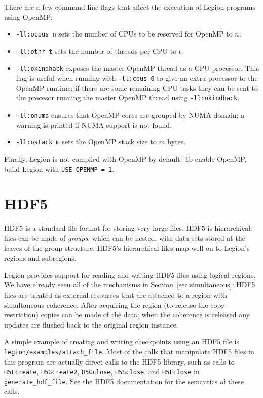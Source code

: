 There are a few command-line flags that affect the execution of Legion programs using OpenMP:
\begin{itemize}

\item {\tt -ll:ocpus n} sets the number of CPUs to be reserved for OpenMP to $n$.
\item {\tt -ll:othr t} sets the number of threads per CPU to $t$.
\item {\tt -ll:okindhack} exposes the master OpenMP thread as a CPU processor. This flag is useful when running with {\tt -ll:cpus 0} to give an extra processor to the OpenMP runtime; if there are some remaining CPU tasks they can be sent to the
    procesor running the master OpenMP thread using {\tt -ll:okindhack}.
\item {\tt -ll:onuma} ensures that OpenMP cores are grouped by NUMA domain; a warning is printed if NUMA support is not found.
\item {\tt -ll:ostack m} sets the OpenMP stack size to $m$ bytes.
\end{itemize}

Finally, Legion is not compiled with OpenMP by default.  To enable OpenMP, build Legion with {\tt USE\_OPENMP = 1}.
  

\section{HDF5}
\label{sechdf5}

HDF5 is a standard file format for storing very large files.  HDF5 is hierarchical: files can be made of {\em groups}, which can
be nested, with data sets stored at the leaves of the group structure.  HDF5's hierarchical files map well on to Legion's
regions and subregions.

Legion provides support for reading and writing HDF5 files using logical regions. We have already seen all of the mechanisms in 
Section~\ref{sec:simultaneous}: HDF5 files are treated as external resources that are attached to a region with simultaneous coherence.  After acquiring
the region (to release the copy restriction) copies can be made of the data; when the coherence is released any updates are
flushed back to the original region instance.

A simple example of creating and writing checkpoints using an HDF5 file is {\tt legion/examples/attach\_file}.  Most
of the calls that manipulate HDF5 files in this program are actually direct calls to the HDF5 library, such as calls to
{\tt H5Fcreate}, {\tt H5Gcreate2}, {\tt H5Gclose}, {\tt H5Sclose}, and {\tt H5Fclose} in {\tt generate\_hdf\_file}.  See the
HDF5 documentation for the semantics of these calls.

